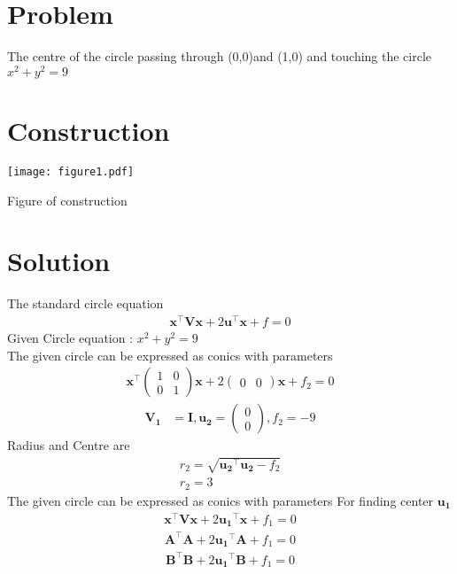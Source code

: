 \documentclass[10pt, a4paper]{article}
\title{\mytitle}
\author{\myauthor\hspace{1em}\\\contact\\FWC22066\hspace{6.5em}IITH\hspace{0.5em}\mymodule\hspace{6em}Assignment}
\newcommand{\myvec}[1]{\ensuremath{\begin{pmatrix}#1\end{pmatrix}}}
\let\vec\mathbf
\begin{document}
	\maketitle
	\tableofcontents
   \section{Problem}
   The centre of the circle passing through (0,0)and (1,0) and touching the circle
   $x^2+y^2=9$
\section{Construction}
  \texttt{[image: figure1.pdf]}
  	\begin{center}
  Figure of construction
  	\end{center}
  \section{Solution}
The standard circle equation\\
\begin{align}
\vec{x}^{\top}\vec{V}\vec{x}+2\vec{u}^{\top}\vec{x}+f=0
\end{align}
Given Circle equation : $x^2+y^2=9$\\
The given circle  can be expressed as conics with parameters
\begin{align}
\vec{x}^{\top}\myvec{1&0\\0&1}\vec{x}+2\myvec{0&0}\vec{x}+f_2=0
\end{align}
\begin{align}
	\vec{V_1} &= \vec{I}, \vec{u_2} = \myvec{0\\0}, f_2 = -9
	\end{align}
	Radius and Centre are
\begin{align}
r_2=\sqrt{{\vec{u_2}^{\top}\vec{u_2}}-f_2 }\\
{r_2}=3
\end{align}
The given circle  can be expressed as conics with parameters
For finding center $\vec{u_1}$
\begin{align}
\vec{x}^{\top}\vec{V}\vec{x}+2\vec{u_1}^{\top}\vec{x}+f_1=0
\end{align}
\begin{align}
    \vec{A}^{\top}\vec{A}+2\vec{u_1}^{\top}\vec{A}+f_1=0
    \end{align}
\begin{align}
\vec{B}^{\top}\vec{B}+2\vec{u_1}^{\top}\vec{B}+f_1=0
\end{align}
\end{document}
